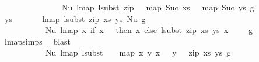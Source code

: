 \begin{isabellebody}
\ \ \ \ \ \ \ \ \ \ \ \ \ \ \ Nu\ {\isacharparenleft}{\kern0pt}lmap\ {\isacharparenleft}{\kern0pt}lsubst\ {\isacharparenleft}{\kern0pt}zip\ {\isacharparenleft}{\kern0pt}{}\ {\isacharhash}{\kern0pt}\ map\ Suc\ xs{\isacharparenright}{\kern0pt}\ {\isacharparenleft}{\kern0pt}{}\ {\isacharhash}{\kern0pt}\ map\ Suc\ ys{\isacharparenright}{\kern0pt}{\isacharparenright}{\kern0pt}{\isacharparenright}{\kern0pt}\ g{\isacharparenright}{\kern0pt}{\isachardoublequoteclose}\isanewline
\ \ \ \isamarkupfalse%
\isanewline
\ \ \ \ \ \isamarkupfalse%
\ ys\isanewline
\ \ \ \ \ \isamarkupfalse%
\ {\isachardoublequoteopen}lmap\ {\isacharparenleft}{\kern0pt}lsubst\ {\isacharparenleft}{\kern0pt}zip\ xs\ ys{\isacharparenright}{\kern0pt}{\isacharparenright}{\kern0pt}\ {\isacharparenleft}{\kern0pt}Nu\ g{\isacharparenright}{\kern0pt}\ {\isacharequal}{\kern0pt}\isanewline
\ \ \ \ \ \ \ \ \ \ \ Nu\ {\isacharparenleft}{\kern0pt}lmap\ {\isacharparenleft}{\kern0pt}{\isasymlambda}x{\isachardot}{\kern0pt}\ if\ x\ {\isacharequal}{\kern0pt}\ {}\ then\ x\ else\ {\isacharparenleft}{\kern0pt}lsubst\ {\isacharparenleft}{\kern0pt}zip\ xs\ ys{\isacharparenright}{\kern0pt}\ {\isacharparenleft}{\kern0pt}x\ {\isacharminus}{\kern0pt}\ {}{\isacharparenright}{\kern0pt}\ {\isacharplus}{\kern0pt}\ {}{\isacharparenright}{\kern0pt}{\isacharparenright}{\kern0pt}\ g{\isacharparenright}{\kern0pt}{\isachardoublequoteclose}\isanewline
\ \ \ \ \ \ \ \isamarkupfalse%
\ lmap{\isachardot}{\kern0pt}simps{\isacharparenleft}{\kern0pt}{}{\isacharparenright}{\kern0pt}\ \isamarkupfalse%
\ blast\isanewline
\ \ \ \ \ \isamarkupfalse%
\ \isamarkupfalse%
\ {\isachardoublequoteopen}{\isachardot}{\kern0pt}{\isachardot}{\kern0pt}{\isachardot}{\kern0pt}\ {\isacharequal}{\kern0pt}\isanewline
\ \ \ \ \ \ \ \ \ \ \ Nu\ {\isacharparenleft}{\kern0pt}lmap\ {\isacharparenleft}{\kern0pt}lsubst\ {\isacharparenleft}{\kern0pt}{\isacharparenleft}{\kern0pt}{}{\isacharcomma}{\kern0pt}\ {}{\isacharparenright}{\kern0pt}\ {\isacharhash}{\kern0pt}\ map\ {\isacharparenleft}{\kern0pt}{\isasymlambda}{\isacharparenleft}{\kern0pt}x{\isacharcomma}{\kern0pt}\ y{\isacharparenright}{\kern0pt}{\isachardot}{\kern0pt}\ {\isacharparenleft}{\kern0pt}x\ {\isacharplus}{\kern0pt}\ {}{\isacharcomma}{\kern0pt}\ y\ {\isacharplus}{\kern0pt}\ {}{\isacharparenright}{\kern0pt}{\isacharparenright}{\kern0pt}\ {\isacharparenleft}{\kern0pt}zip\ xs\ ys{\isacharparenright}{\kern0pt}{\isacharparenright}{\kern0pt}{\isacharparenright}{\kern0pt}\ g{\isacharparenright}{\kern0pt}{\isachardoublequoteclose}\isanewline

\end{isabellebody}
